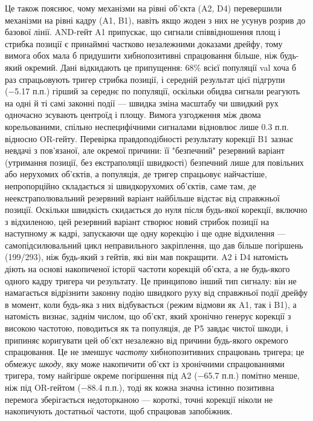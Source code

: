 \documentclass[11pt]{article}
\begin{document}
Це також пояснює, чому механізми на рівні об'єкта (A2, D4) перевершили механізми на рівні кадру (A1, B1), навіть якщо жоден з них не усунув розрив до базової лінії. AND-гейт A1 припускає, що сигнали співвідношення площ і стрибка позиції є принаймні частково незалежними доказами дрейфу, тому вимога обох мала б придушити хибнопозитивні спрацювання більше, ніж будь-який окремий. Дані відкидають це припущення: 68\% всієї популяції val хоча б раз спрацьовують тригер стрибка позиції, і середній результат цієї підгрупи (−5.17 п.п.) гірший за середнє по популяції, оскільки обидва сигнали реагують на одні й ті самі законні події --- швидка зміна масштабу чи швидкий рух одночасно зсувають центроїд і площу. Вимога узгодження між двома корельованими, спільно неспецифічними сигналами відновлює лише 0.3 п.п. відносно OR-гейту. Перевірка правдоподібності результату корекції B1 зазнає невдачі з пов'язаної, але окремої причини: її "безпечний" резервний варіант (утримання позиції, без екстраполяції швидкості) безпечний лише для повільних або нерухомих об'єктів, а популяція, де тригер спрацьовує найчастіше, непропорційно складається зі швидкорухомих об'єктів, саме там, де неекстраполювальний резервний варіант найбільше відстає від справжньої позиції. Оскільки швидкість скидається до нуля після будь-якої корекції, включно з відхиленою, цей резервний варіант створює новий стрибок позиції на наступному ж кадрі, запускаючи ще одну корекцію і ще одне відхилення --- самопідсилювальний цикл неправильного закріплення, що дав більше погіршень (199/293), ніж будь-який з гейтів, які він мав покращити. A2 і D4 натомість діють на основі накопиченої історії частоти корекцій об'єкта, а не будь-якого одного кадру тригера чи результату. Це принципово інший тип сигналу: він не намагається відрізнити законну подію швидкого руху від справжньої події дрейфу в момент, коли будь-яка з них відбувається (режим відмови як A1, так і B1), а натомість визнає, заднім числом, що об'єкт, який хронічно генерує корекції з високою частотою, поводиться як та популяція, де P5 завдає чистої шкоди, і припиняє коригувати цей об'єкт незалежно від причини будь-якого окремого спрацювання. Це не зменшує \emph{частоту} хибнопозитивних спрацювань тригера; це обмежує \emph{шкоду}, яку може накопичити об'єкт із хронічними спрацюваннями тригера, тому найгірше окреме погіршення під A2 (−65.7 п.п.) помітно менше, ніж під OR-гейтом (−88.4 п.п.), тоді як кожна значна істинно позитивна перемога зберігається недоторканою --- короткі, точні корекції ніколи не накопичують достатньої частоти, щоб спрацював запобіжник.
\end{document}
